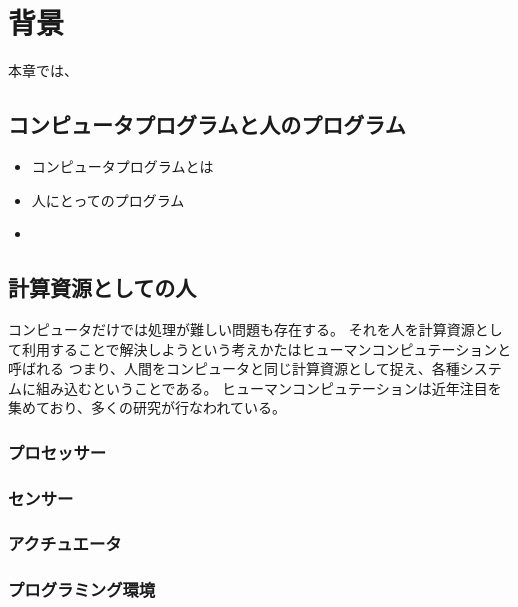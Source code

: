\chapter{背景}
\label{chap:background}

本章では、

\section{コンピュータプログラムと人のプログラム}\label{ux30b3ux30f3ux30d4ux30e5ux30fcux30bfux30d7ux30edux30b0ux30e9ux30e0ux3068ux4ebaux306eux30d7ux30edux30b0ux30e9ux30e0}

\begin{itemize}
\item
  コンピュータプログラムとは
\item
  人にとってのプログラム
\item
\end{itemize}

\section{計算資源としての人}\label{ux8a08ux7b97ux8cc7ux6e90ux3068ux3057ux3066ux306eux4eba}

コンピュータだけでは処理が難しい問題も存在する。
それを人を計算資源として利用することで解決しようという考えかたはヒューマンコンピュテーション\cite{humancomputation}と呼ばれる
つまり、人間をコンピュータと同じ計算資源として捉え、各種システムに組み込むということである。
ヒューマンコンピュテーションは近年注目を集めており、多くの研究が行なわれている。

\subsection{プロセッサー}\label{ux30d7ux30edux30bbux30c3ux30b5ux30fc}

\subsection{センサー}\label{ux30bbux30f3ux30b5ux30fc}

\subsection{アクチュエータ}\label{ux30a2ux30afux30c1ux30e5ux30a8ux30fcux30bf}

\subsection{プログラミング環境}\label{ux30d7ux30edux30b0ux30e9ux30dfux30f3ux30b0ux74b0ux5883}

